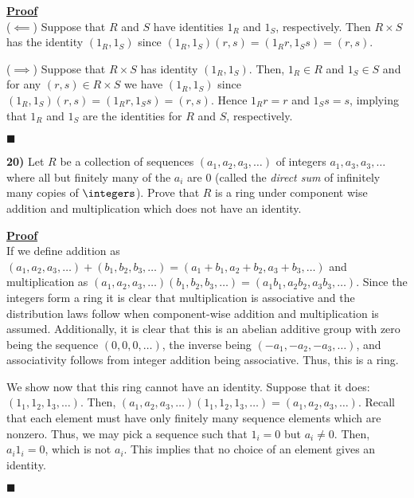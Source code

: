 \documentclass[12pt,a4paper]{article}
\newcommand{\prob}[2]{\textbf{#1)} #2}
\newenvironment{proof}
{
\textbf{\underline{Proof}} \\
}
{
\begin{flushright}
$\blacksquare$
\end{flushright}}
\begin{document}
\begin{proof}
($\impliedby$) Suppose that $R$ and $S$ have identities $1_R$ and $1_S$, respectively. Then $R \times S$ has the identity $(1_R,1_S)$ since $(1_R,1_S)(r,s) = (1_Rr,1_Ss) = (r,s)$.

($\implies$) Suppose that $R \times S$ has identity $(1_R,1_S)$. Then, $1_R \in R$ and $1_S \in S$ and for any $(r,s) \in R \times S$ we have $(1_R,1_S)$ since $(1_R,1_S)(r,s) = (1_Rr,1_Ss) = (r,s)$. Hence $1_Rr = r$ and $1_Ss = s$, implying that $1_R$ and $1_S$ are the identities for $R$ and $S$, respectively.
\end{proof}

\prob{20}{Let $R$ be a collection of sequences $(a_1,a_2,a_3,\ldots)$ of integers $a_1,a_3,a_3,\ldots$ where all but finitely many of the $a_i$ are 0 (called the \textit{direct sum} of infinitely many copies of $\integers$). Prove that $R$ is a ring under component wise addition and multiplication which does not have an identity.}

\begin{proof}
If we define addition as $(a_1,a_2,a_3,\ldots) + (b_1,b_2,b_3,\ldots) = (a_1 + b_1,a_2 + b_2,a_3 + b_3,\ldots)$ and multiplication as $(a_1,a_2,a_3,\ldots)(b_1,b_2,b_3,\ldots) = (a_1b_1,a_2b_2,a_3b_3,\ldots)$. Since the integers form a ring it is clear that multiplication is associative and the distribution laws follow when component-wise addition and multiplication is assumed. Additionally, it is clear that this is an abelian additive group with zero being the sequence $(0,0,0,\ldots)$, the inverse being $(-a_1,-a_2,-a_3,\ldots)$, and associativity follows from integer addition being associative. Thus, this is a ring. 

We show now that this ring cannot have an identity. Suppose that it does: $(1_1,1_2,1_3,\ldots)$. Then, $(a_1,a_2,a_3,\ldots)(1_1,1_2,1_3,\ldots) = (a_1,a_2,a_3,\ldots)$. Recall that each element must have only finitely many sequence elements which are nonzero. Thus, we may pick a sequence such that $1_i = 0$ but $a_i \not= 0$. Then, $a_i1_i = 0$, which is not $a_i$. This implies that no choice of an element gives an identity.
\end{proof}
\end{document}
